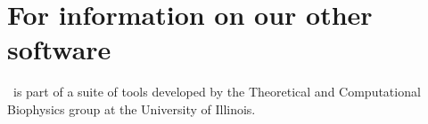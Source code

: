 
%
%
%

\section{For information on our other software}

\VMD\ is part of a suite of tools developed by the 
Theoretical and Computational Biophysics group at the University of Illinois. 

